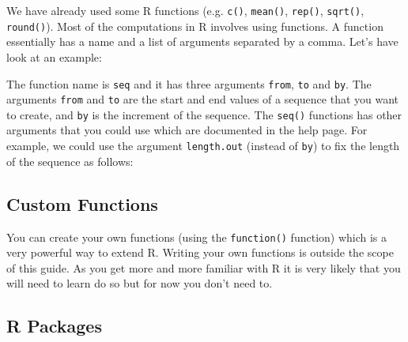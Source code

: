 \documentclass[letterpaperpaper,9pt,twocolumn,twoside,printwatermark=false]{pinp}
\begin{document}
We have already used some R functions (e.g. \texttt{c()},
\texttt{mean()}, \texttt{rep()}, \texttt{sqrt()}, \texttt{round()}).
Most of the computations in R involves using functions. A function
essentially has a name and a list of arguments separated by a comma.
Let's have look at an example:

\begin{Shaded}
\begin{Highlighting}[]
\NormalTok{(} \NormalTok{, } \NormalTok{, } \NormalTok{)}
\end{Highlighting}
\end{Shaded}

The function name is \texttt{seq} and it has three arguments
\texttt{from}, \texttt{to} and \texttt{by}. The arguments \texttt{from}
and \texttt{to} are the start and end values of a sequence that you want
to create, and \texttt{by} is the increment of the sequence. The
\texttt{seq()} functions has other arguments that you could use which
are documented in the help page. For example, we could use the argument
\texttt{length.out} (instead of \texttt{by}) to fix the length of the
sequence as follows:

\begin{Shaded}
\begin{Highlighting}[]
\NormalTok{(} \NormalTok{, } \NormalTok{, } \NormalTok{)}
\end{Highlighting}
\end{Shaded}

\hypertarget{custom-functions}{%
\subsection{Custom Functions}\label{custom-functions}}

You can create your own functions (using the \texttt{function()}
function) which is a very powerful way to extend R. Writing your own
functions is outside the scope of this guide. As you get more and more
familiar with R it is very likely that you will need to learn do so but
for now you don't need to.

\hypertarget{r-packages}{%
\subsection{R Packages}\label{r-packages}}
\end{document}
